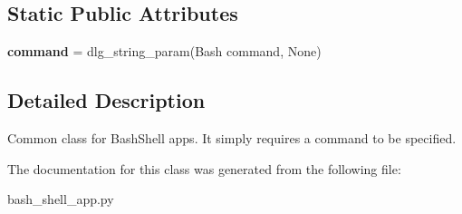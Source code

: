 \subsection*{Static Public Attributes}
\begin{DoxyCompactItemize}
\item 
\mbox{\label{classdlg_1_1apps_1_1bash__shell__app_1_1_bash_shell_base_ab63891fc3aa6c03b321478b08989ba0a}} 
{\bfseries command} = dlg\+\_\+string\+\_\+param(\textquotesingle{}Bash command\textquotesingle{}, None)
\end{DoxyCompactItemize}


\subsection{Detailed Description}
\begin{DoxyVerb}Common class for BashShell apps. It simply requires a command to be
specified.
\end{DoxyVerb}
 

The documentation for this class was generated from the following file\+:\begin{DoxyCompactItemize}
\item 
bash\+\_\+shell\+\_\+app.\+py\end{DoxyCompactItemize}
